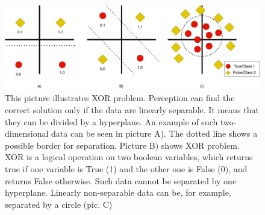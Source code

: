 \begin{figure}[h]
\centering
\includegraphics[width=0.6\columnwidth]{../img/xor}
\caption{This picture illustrates XOR problem. Perception can find the correct solution only if the data are linearly separable. It means that they can be divided by a hyperplane. An example of such two-dimensional data can be seen in picture A). The dotted line shows a possible border for separation. Picture B) shows XOR problem. XOR is a logical operation on two boolean variables, which returns true if one variable is True (1) and the other one is False (0), and returns False otherwise. Such data cannot be separated by one hyperplane. Linearly non-separable data can be, for example, separated by a circle (pic. C)}
\label{pic:xor}
\end{figure}

